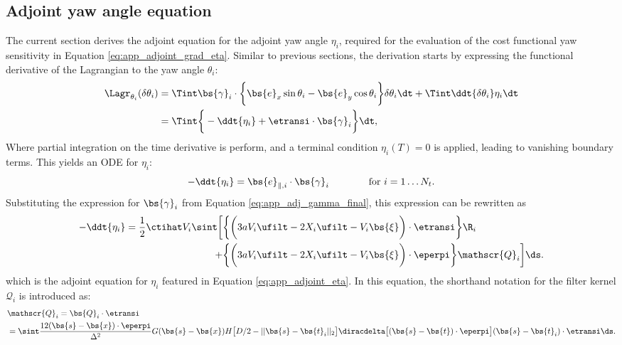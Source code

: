 \subsection{Adjoint yaw angle equation}
The current section derives the adjoint equation for the adjoint yaw angle $\eta_i$, required for the evaluation of the cost functional yaw sensitivity in Equation \eqref{eq:app_adjoint_grad_eta}. Similar to previous sections, the derivation starts by expressing the functional derivative of the Lagrangian to the yaw angle $\theta_i$: 
\begin{align}
\Lagr_{\theta_i}(\delta \theta_i) &= 
\Tint \bs{\gamma}_i \cdot \bigg\{ \bs{e}_x \sin \theta_i - \bs{e}_y \cos \theta_i  \bigg\} \delta \theta_i \dt + \Tint \ddt{\delta \theta_i} \eta_i \dt \\ 
&= \Tint \bigg\{ -\ddt{\eta_i} + \etransi \cdot \bs{\gamma}_i   \bigg\} \dt,
\end{align}
Where partial integration on the time derivative is perform, and a terminal condition $\eta_i(T) = 0$ is applied, leading to vanishing boundary terms. This yields an ODE for $\eta_i$:
\begin{equation}\label{eq:app_adj_eta_basic}
- \ddt{\eta_i} = \bs{e}_{\parallel,i} \cdot \bs{\gamma}_i 
\qquad\qquad \text{for } i=1\dots N_t.
\end{equation}
Substituting the expression for $\bs{\gamma}_i$ from Equation \eqref{eq:app_adj_gamma_final}, this expression can be rewritten as 
\begin{align}
- \ddt{\eta_i} =  \frac{1}{2} \ctihat V_i \sint \bigg[ & \bigg\{ \bigg(3a V_i \ufilt  - 2 X_i \ufilt - V_i\bs{\xi} \bigg) \cdot \etransi   \bigg\} \R_i  \nonumber\\
+ & \bigg\{ \bigg(3aV_i \ufilt  -2 X_i \ufilt - V_i\bs{\xi} \bigg) \cdot \eperpi \bigg\} \mathscr{Q}_i \bigg] \ds. \label{eq:app_adj_eta_final} 
\end{align}
which is the adjoint equation for $\eta_i$ featured in Equation \eqref{eq:app_adjoint_eta}. In this equation, the shorthand notation for the filter kernel $\mathscr{Q}_i$ is introduced as:
{\small
\begin{align}
	& \mathscr{Q}_i = \bs{Q}_i \cdot \etransi \nonumber \\
	&= \sint \frac{12 (\bs{s} - \bs{x})\cdot \eperpi}{\Delta^2} G(\bs{s} - \bs{x})  H\big[D/2 - \vert\vert \bs{s} - \bs{t}_i \vert\vert_2 \big] \diracdelta\big[(\bs{s} - \bs{t})\cdot \eperpi \big]  (\bs{s} - \bs{t}_i) \cdot \etransi \ds.
\end{align}}

